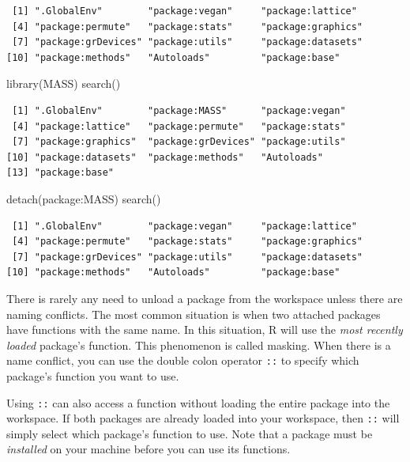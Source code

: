 \documentclass[
  13,
  letterpaper,
]{report}
\newenvironment{Shaded}{\begin{snugshade}}{\end{snugshade}}
\newcommand{\FunctionTok}[1]{\textcolor[rgb]{0.28,0.35,0.67}{#1}}
\newcommand{\NormalTok}[1]{\textcolor[rgb]{0.00,0.23,0.31}{#1}}
\newcommand{\SpecialCharTok}[1]{\textcolor[rgb]{0.37,0.37,0.37}{#1}}
\begin{document}
\begin{verbatim}
 [1] ".GlobalEnv"        "package:vegan"     "package:lattice"  
 [4] "package:permute"   "package:stats"     "package:graphics" 
 [7] "package:grDevices" "package:utils"     "package:datasets" 
[10] "package:methods"   "Autoloads"         "package:base"     
\end{verbatim}

\begin{Shaded}
\begin{Highlighting}[]
\FunctionTok{library}\NormalTok{(MASS)}
\FunctionTok{search}\NormalTok{()}
\end{Highlighting}
\end{Shaded}

\begin{verbatim}
 [1] ".GlobalEnv"        "package:MASS"      "package:vegan"    
 [4] "package:lattice"   "package:permute"   "package:stats"    
 [7] "package:graphics"  "package:grDevices" "package:utils"    
[10] "package:datasets"  "package:methods"   "Autoloads"        
[13] "package:base"     
\end{verbatim}

\begin{Shaded}
\begin{Highlighting}[]
\FunctionTok{detach}\NormalTok{(package}\SpecialCharTok{:}\NormalTok{MASS)}
\FunctionTok{search}\NormalTok{()}
\end{Highlighting}
\end{Shaded}

\begin{verbatim}
 [1] ".GlobalEnv"        "package:vegan"     "package:lattice"  
 [4] "package:permute"   "package:stats"     "package:graphics" 
 [7] "package:grDevices" "package:utils"     "package:datasets" 
[10] "package:methods"   "Autoloads"         "package:base"     
\end{verbatim}

There is rarely any need to unload a package from the workspace unless
there are naming conflicts. The most common situation is when two
attached packages have functions with the same name. In this situation,
R will use the \emph{most recently loaded} package's function. This
phenomenon is called masking. When there is a name conflict, you can use
the double colon operator \texttt{::} to specify which package's
function you want to use.

Using \texttt{::} can also access a function without loading the entire
package into the workspace. If both packages are already loaded into
your workspace, then \texttt{::} will simply select which package's
function to use. Note that a package must be \emph{installed} on your
machine before you can use its functions.
\end{document}
